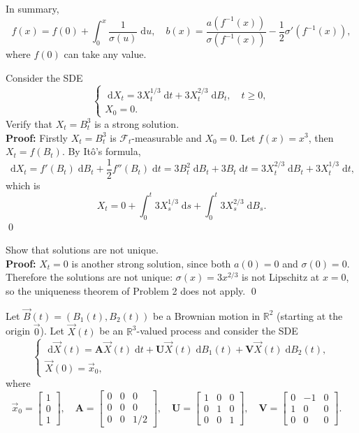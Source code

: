 \documentclass{MFM-hw} %
\newcommand{\filtration}{\mathcal{F}_t}
\newcommand{\dd}{\;\mathrm{d}}
\newcommand{\Ito}{It\^{o}}
\newcommand{\realset}{\mathbb{R}}
\begin{document}
In summary, 
\[
    f(x) = f(0) + \int_0^x \frac{1}{\sigma(u)} \dd u, \quad
    b(x) = \frac{a(f^{-1}(x))}{\sigma(f^{-1}(x))} - \frac{1}{2}\sigma'(f^{-1}(x)),
\]
where $f(0)$ can take any value.

\HWproblem
Consider the SDE
\[
\begin{cases}
    \dd X_t = 3 X_t^{1/3} \dd t + 3 X_t^{2/3} \dd B_t, \quad t \ge 0,\\
    X_0 = 0.
\end{cases}
\]
\HWsubproblem
Verify that $X_t = B_t^3$ is a strong solution.\\

\textbf{Proof: }Firstly $X_t = B_t^3$ is $\filtration$-measurable and $X_0 = 0$. Let $f(x) = x^3$, then $X_t = f(B_t)$. By \Ito's formula,
\[
    \dd X_t = f'(B_t)\dd B_t + \frac{1}{2} f''(B_t)\dd t = 3B_t^2 \dd B_t + 3B_t \dd t = 3X_t^{2/3} \dd B_t + 3X_t^{1/3} \dd t,
\]
which is
\[
    X_t = 0 + \int_0^t 3X_s^{1/3} \dd s + \int_0^{t} 3 X_s^{2/3} \dd B_s.
\]\qed

\HWsubproblem
Show that solutions are not unique.\\

\textbf{Proof: } $X_t = 0$ is another strong solution, since both $a(0) = 0$ and $\sigma(0) = 0$. Therefore the solutions are not unique: $\sigma(x) = 3x^{2/3}$ is not Lipschitz at $x = 0$, so the uniqueness theorem of Problem 2 does not apply. \qed

\HWproblem
Let $\vec{B}(t) = (B_1(t), B_2(t))$ be a Brownian motion in $\realset^2$
(starting at the origin $\vec{0}$). Let $\vec{X}(t)$ be an $\realset^3$-valued process and consider the SDE
\[
    \begin{cases}
        \dd \vec{X}(t) = \boldsymbol{A} \vec{X}(t) \dd t + \boldsymbol{U} \vec{X}(t) \dd B_1(t) + \boldsymbol{V} \vec{X}(t) \dd B_2(t),\\
        \vec{X}(0) = \vec{x}_0,
    \end{cases}
\]
where 
\[
    \vec{x}_0 = 
        \begin{bmatrix}
            1 \\
            0 \\
            1
        \end{bmatrix}, \quad
    \boldsymbol{A} = 
        \begin{bmatrix}
            0 & 0 & 0 \\
            0 & 0 & 0 \\
            0 & 0 & 1/2
        \end{bmatrix}, \quad
    \boldsymbol{U} = 
        \begin{bmatrix}
            1 & 0 & 0 \\
            0 & 1 & 0 \\
            0 & 0 & 1
        \end{bmatrix}, \quad
    \boldsymbol{V} = 
        \begin{bmatrix}
            0 & -1 & 0 \\
            1 & 0 & 0 \\
            0 & 0 & 0
        \end{bmatrix}. \quad
\]
\end{document}
